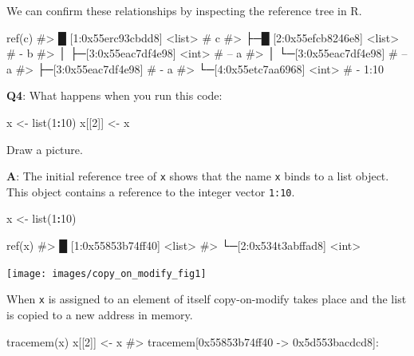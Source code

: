 \documentclass[
]{krantz}
\makeatletter
\newenvironment{Shaded}{\begin{snugshade}}{\end{snugshade}}
\newcommand{\CommentTok}[1]{\textcolor[rgb]{0.56,0.35,0.01}{\textit{#1}}}
\newcommand{\DecValTok}[1]{\textcolor[rgb]{0.00,0.00,0.81}{#1}}
\newcommand{\KeywordTok}[1]{\textcolor[rgb]{0.13,0.29,0.53}{\textbf{#1}}}
\newcommand{\NormalTok}[1]{#1}
\newcommand{\OperatorTok}[1]{\textcolor[rgb]{0.81,0.36,0.00}{\textbf{#1}}}
\newcommand{\StringTok}[1]{\textcolor[rgb]{0.31,0.60,0.02}{#1}}
\newenvironment{kframe}{%
\medskip{}
\setlength{\fboxsep}{.8em}
 \def\at@end@of@kframe{}%
 \ifinner\ifhmode%
  \def\at@end@of@kframe{\end{minipage}}%
  \begin{minipage}{\columnwidth}%
 \fi\fi%
 \def\FrameCommand##1{\hskip\@totalleftmargin \hskip-\fboxsep
 \colorbox{shadecolor}{##1}\hskip-\fboxsep
     \hskip-\linewidth \hskip-\@totalleftmargin \hskip\columnwidth}%
 \MakeFramed {\advance\hsize-\width
   \@totalleftmargin\z@ \linewidth\hsize
   \@setminipage}}%
 {\par\unskip\endMakeFramed%
 \at@end@of@kframe}
\renewenvironment{Shaded}{\begin{kframe}}{\end{kframe}}
\renewcommand{\KeywordTok} [1]{\textcolor[rgb]{0.00,0.44,0.13}{{#1}}}
\renewcommand{\DecValTok}  [1]{\textcolor[rgb]{0.25,0.63,0.44}{{#1}}}
\renewcommand{\StringTok}  [1]{\textcolor[rgb]{0.25,0.44,0.63}{{#1}}}
\renewcommand{\CommentTok} [1]{\textcolor[rgb]{0.38,0.63,0.69}{{#1}}}
\renewcommand{\NormalTok}  [1]{{#1}}
\makeatother
\begin{document}
We can confirm these relationships by inspecting the reference tree in R.

\begin{Shaded}
\begin{Highlighting}[]
\KeywordTok{ref}\NormalTok{(c)}
\CommentTok{#> █ [1:0x55erc93cbdd8] <list>    # c}
\CommentTok{#> ├─█ [2:0x55efcb8246e8] <list>  # - b}
\CommentTok{#> │ ├─[3:0x55eac7df4e98] <int>   # -- a}
\CommentTok{#> │ └─[3:0x55eac7df4e98]         # -- a}
\CommentTok{#> ├─[3:0x55eac7df4e98]           # - a}
\CommentTok{#> └─[4:0x55etc7aa6968] <int>     # - 1:10}
\end{Highlighting}
\end{Shaded}

\textbf{{Q4}}: What happens when you run this code:

\begin{Shaded}
\begin{Highlighting}[]
\NormalTok{x <-}\StringTok{ }\KeywordTok{list}\NormalTok{(}\DecValTok{1}\OperatorTok{:}\DecValTok{10}\NormalTok{)}
\NormalTok{x[[}\DecValTok{2}\NormalTok{]] <-}\StringTok{ }\NormalTok{x}
\end{Highlighting}
\end{Shaded}

Draw a picture.

\textbf{{A}}: The initial reference tree of \texttt{x} shows that the name \texttt{x} binds to a list object. This object contains a reference to the integer vector \texttt{1:10}.

\begin{Shaded}
\begin{Highlighting}[]
\NormalTok{x <-}\StringTok{ }\KeywordTok{list}\NormalTok{(}\DecValTok{1}\OperatorTok{:}\DecValTok{10}\NormalTok{)}

\KeywordTok{ref}\NormalTok{(x)}
\CommentTok{#> █ [1:0x55853b74ff40] <list> }
\CommentTok{#> └─[2:0x534t3abffad8] <int> }
\end{Highlighting}
\end{Shaded}

\begin{center}\texttt{[image: images/copy\_on\_modify\_fig1]} \end{center}

When \texttt{x} is assigned to an element of itself copy-on-modify takes place and the list is copied to a new address in memory.

\begin{Shaded}
\begin{Highlighting}[]
\KeywordTok{tracemem}\NormalTok{(x)}
\NormalTok{x[[}\DecValTok{2}\NormalTok{]] <-}\StringTok{ }\NormalTok{x}
\CommentTok{#> tracemem[0x55853b74ff40 -> 0x5d553bacdcd8]:}
\end{Highlighting}
\end{Shaded}
\end{document}
